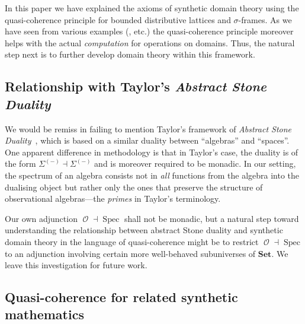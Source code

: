 \documentclass[a4paper,12pt]{amsart}
\theoremstyle{definition}
\newcommand{\mc}[1]{\mathcal{#1}}
\newcommand{\mb}[1]{\mathbf{#1}}
\newcommand{\mbb}[1]{\mathbb{#1}}
\newcommand{\I}{\mbb I}
\newcommand{\Set}{\mb{Set}}
\newcommand{\spec}{\operatorname{Spec}}
\newcommand{\opens}{\operatorname{\mc{O}}} %
\begin{document}
In this paper we have explained the axioms of synthetic domain theory using the quasi-coherence principle for bounded distributive lattices and $\sigma$-frames. As we have seen from various examples (,  etc.) the quasi-coherence principle moreover helps with the actual \emph{computation} for operations on domains. Thus, the natural step next is to further develop domain theory within this framework.


\subsection{Relationship with Taylor's \emph{Abstract Stone Duality}}

We would be remiss in failing to mention Taylor's framework of \emph{Abstract Stone Duality}~\cite{Taylor2011,TaylorP:insema,TaylorP:sobsc}, which is based on a similar duality between ``algebras'' and ``spaces''. One apparent difference in methodology is that in Taylor's case, the duality is of the form $\Sigma^{(-)} \dashv \Sigma^{(-)}$ and is moreover required to be monadic. In our setting, the spectrum of an algebra consists not in \emph{all} functions from the algebra into the dualising object but rather only the ones that preserve the structure of observational algebras—the \emph{primes} in Taylor's terminology.

Our own adjunction $\opens\dashv\spec$ shall not be monadic, but a natural step toward understanding the relationship between abstract Stone duality and synthetic domain theory in the language of quasi-coherence might be to restrict $\opens\dashv\spec$ to an adjunction involving certain more well-behaved subuniverses of $\Set$. We leave this investigation for future work.

\subsection{Quasi-coherence for related synthetic mathematics}
\end{document}
